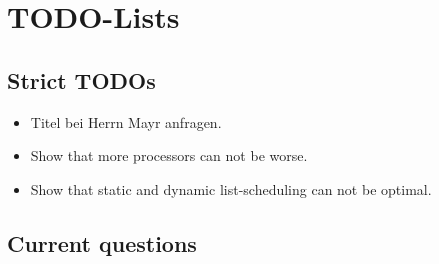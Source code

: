 \documentclass[a4paper, 10pt, oneside]{book}
\begin{document}
% 
% 
% 


\chapter{TODO-Lists}
\label{chap:todo}

\section{Strict TODOs}
\label{sec:strict-todos}

\begin{itemize}
\item Titel bei Herrn Mayr anfragen.
\item Show that more processors can not be worse.
\item Show that static and dynamic list-scheduling can not be optimal.\done{}
\end{itemize}

\section{Current questions}
\label{chap:current-questions}
\end{document}
